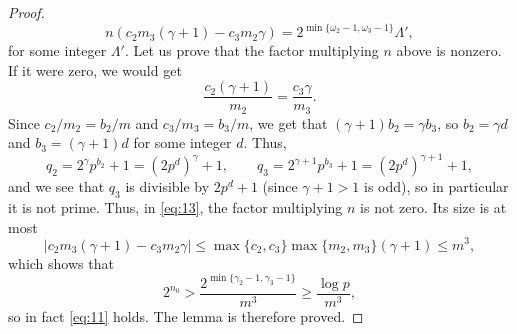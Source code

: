 \documentclass[10pt,a4paper]{amsart}
\begin{document}
\begin{proof}
\begin{equation}
\label{eq:14}
n(c_2 m_3(\gamma+1)-c_3m_2\gamma)=2^{\min\{\omega_2-1,\omega_3-1\}}\Lambda',
\end{equation}
for some integer $\Lambda'$. Let us prove that the factor multiplying $n$ above is nonzero. If it were zero, we would get
$$
\frac{c_2(\gamma+1)}{m_2}=\frac{c_3\gamma}{m_3}.
$$
Since $c_2/m_2=b_2/m$ and $c_3/m_3=b_3/m$, we get that $(\gamma+1)b_2=\gamma b_3$, so $b_2=\gamma d$ and $b_3=(\gamma+1)d$ for some integer $d$. Thus, 
$$
q_2=2^{\gamma} p^{b_2}+1=(2p^d)^{\gamma}+1,\qquad q_3=2^{\gamma+1} p^{b_3}+1=(2p^d)^{\gamma+1}+1,
$$
and we see that $q_3$ is divisible by $2p^d+1$ (since $\gamma+1>1$ is odd), so in particular it is not prime. Thus, in \eqref{eq:13}, the factor multiplying $n$ is not zero. Its size is at most
$$
|c_2m_3(\gamma+1)-c_3m_2\gamma|\le \max\{c_2,c_3\}\max\{m_2,m_3\}(\gamma+1)\le m^3,
$$
which shows that 
$$
2^{n_0}> \frac{2^{\min\{\gamma_2-1,\gamma_3-1\}}}{m^3}\ge \frac{\log p}{m^3},
$$
so in fact \eqref{eq:11} holds. The lemma is therefore proved.  
\end{proof}
\end{document}
